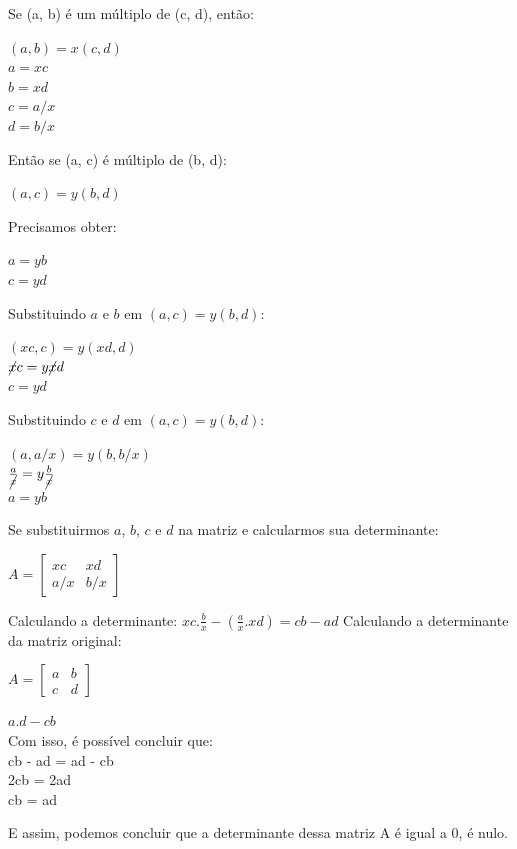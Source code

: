 \documentclass[paper=a4]{article}
\begin{document}
	{\large
	Se (a, b) é um múltiplo de (c, d), então:\\	
	\begin{center}
			$(a, b) = x(c, d)$\\
			$a = xc$\\
			$b = xd$\\
			$c = a/x$\\
			$d = b/x$
	\end{center}
	Então se (a, c) é múltiplo de (b, d):\\
	\begin{center}
			$(a, c) = y(b, d)$\\
	\end{center}
	Precisamos obter:
	\begin{center}
			$a = yb$\\
			$c = yd$
	\end{center}
	Substituindo $a$ e $b$ em $(a, c) = y(b, d)$:\\
	\begin{center}
			$(xc, c) = y(xd, d)$\\
			$\cancel{x}c = y\cancel{x}d$\\
			$c = yd$ 
	\end{center}
	Substituindo $c$ e $d$ em $(a, c) = y(b, d)$:
	\begin{center}
			$(a, a/x) = y(b, b/x)$\\
			\vspace{0.1cm}
			$\frac{a}{\cancel{x}} = y\frac{b}{\cancel{x}}$\\
			\vspace{0.1cm}
			$a = yb$ 
	\end{center}
	Se substituirmos $a$, $b$, $c$ e $d$ na matriz e calcularmos sua determinante:
	\begin{center}{\Large$
			A =	\begin{bmatrix}
				xc & xd\\
				a/x & b/x
	\end{bmatrix}$} \end{center}
	Calculando a determinante: 
	$xc . \frac{b}{x} - (\frac{a}{x} . xd) =  cb - ad$
	Calculando a determinante da matriz original:
	\begin{center}{\Large$
		A =	\begin{bmatrix}
			a& b\\
			c& d
		\end{bmatrix}$} \end{center}
	\begin{flushleft}
		$a . d - c b$\\
		Com isso, é possível concluir que:\\
		cb - ad = ad - cb\\
	 	2cb = 2ad\\
	 	cb = ad
	\end{flushleft}
 	E assim, podemos concluir que a determinante dessa matriz A é igual a 0, é nulo.
	\newpage
	
}
\end{document}
